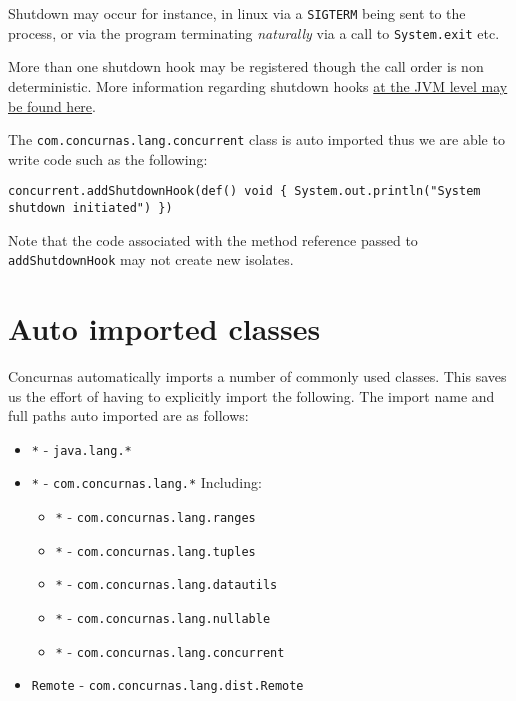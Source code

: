 \documentclass[conc-doc]{subfiles}
\begin{document}
Shutdown may occur for instance, in linux via a \lstinline{SIGTERM} being sent to the process, or via the program terminating \textit{naturally} via a call to \lstinline{System.exit} etc.

More than one shutdown hook may be registered though the call order is non deterministic. More information regarding shutdown hooks \href{https://docs.oracle.com/javase/8/docs/api/java/lang/Runtime.html#addShutdownHook-java.lang.Thread-}{at the JVM level may be found here}.

The \lstinline{com.concurnas.lang.concurrent} class is auto imported thus we are able to write code such as the following:

\begin{lstlisting}
concurrent.addShutdownHook(def() void { System.out.println("System shutdown initiated") })
\end{lstlisting}

Note that the code associated with the method reference passed to \lstinline{addShutdownHook} may not create new isolates.

\section{Auto imported classes}
Concurnas automatically imports a number of commonly used classes. This saves us the effort of having to explicitly import the following. The import name and full paths auto imported are as follows:

\begin{itemize}
	\item \lstinline{*} - \lstinline{java.lang.*}
	\item \lstinline{*} - \lstinline{com.concurnas.lang.*} Including:
	\begin{itemize}
		\item \lstinline{*} - \lstinline{com.concurnas.lang.ranges}
		\item \lstinline{*} - \lstinline{com.concurnas.lang.tuples}
		\item \lstinline{*} - \lstinline{com.concurnas.lang.datautils}
		\item \lstinline{*} - \lstinline{com.concurnas.lang.nullable}
		\item \lstinline{*} - \lstinline{com.concurnas.lang.concurrent}
	\end{itemize}
	\item \lstinline{Remote} - \lstinline{com.concurnas.lang.dist.Remote}
\end{itemize}
\end{document}
